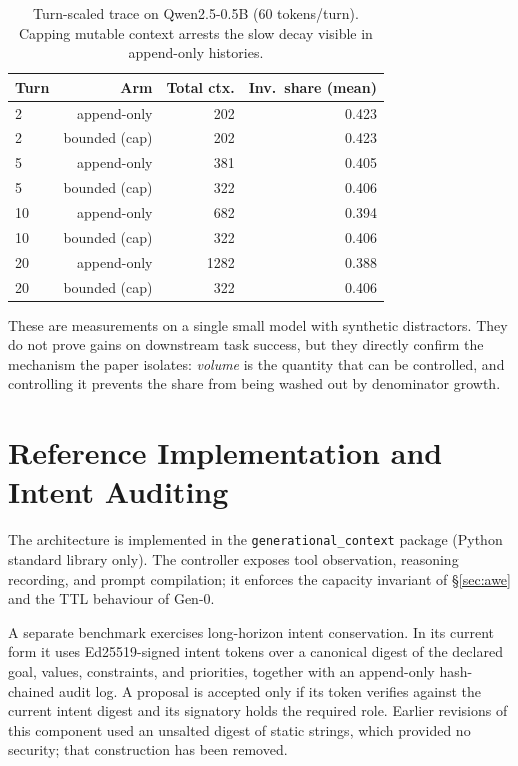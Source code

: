 ﻿\documentclass[11pt,a4paper]{article}
\theoremstyle{plain}
\theoremstyle{definition}
\theoremstyle{remark}
\begin{document}
\begin{table}[ht]
\centering
\small
\begin{tabular}{lrrr}
\toprule
\textbf{Turn} & \textbf{Arm} & \textbf{Total ctx.} & \textbf{Inv.\ share (mean)} \\
\midrule
2  & append-only & 202 & 0.423 \\
2  & bounded (cap) & 202 & 0.423 \\
5  & append-only & 381 & 0.405 \\
5  & bounded (cap) & 322 & 0.406 \\
10 & append-only & 682 & 0.394 \\
10 & bounded (cap) & 322 & 0.406 \\
20 & append-only & 1282& 0.388 \\
20 & bounded (cap) & 322 & 0.406 \\
\bottomrule
\end{tabular}
\caption{Turn-scaled trace on Qwen2.5-0.5B (60 tokens/turn). Capping mutable
context arrests the slow decay visible in append-only histories.}
\label{tab:liveturns}
\end{table}

These are measurements on a single small model with synthetic distractors.
They do not prove gains on downstream task success, but they directly confirm
the mechanism the paper isolates: \emph{volume} is the quantity that can be
controlled, and controlling it prevents the share from being washed out by
denominator growth.

\section{Reference Implementation and Intent Auditing}
\label{sec:impl}

The architecture is implemented in the \texttt{generational\_context} package
(Python standard library only). The controller exposes tool observation,
reasoning recording, and prompt compilation; it enforces the capacity invariant
of \S\ref{sec:awe} and the TTL behaviour of Gen-0.

A separate benchmark exercises long-horizon intent conservation. In its current
form it uses Ed25519-signed intent tokens over a canonical digest of the
declared goal, values, constraints, and priorities, together with an append-only
hash-chained audit log. A proposal is accepted only if its token verifies
against the current intent digest and its signatory holds the required role.
Earlier revisions of this component used an unsalted digest of static strings,
which provided no security; that construction has been removed.
\end{document}
